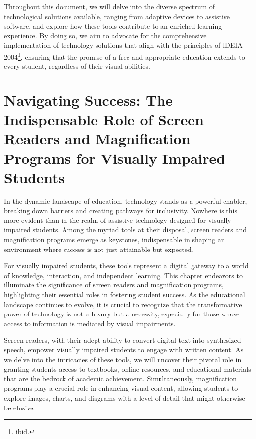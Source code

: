\documentclass[14pt,letterpaper,twoside]{extreport}
\begin{document}
 Throughout this document, we will delve into the diverse spectrum of technological solutions available, ranging from adaptive devices to assistive software, and explore how these tools contribute to an enriched learning experience. By doing so, we aim to advocate for the comprehensive implementation of technology solutions that align with the principles of IDEIA 2004\footnote{\href{https://sites.ed.gov/idea/statuteregulations/}{ibid.}}, ensuring that the promise of a free and appropriate education extends to every student, regardless of their visual abilities.

\pagebreak
\fancyhead[RO]{\lastxmark}
\fancyhead[LE]{\firstxmark}

\hypertarget{vision-assistive-technology-laptop-computer-requirements}{\chapter{Navigating Success: The Indispensable Role of Screen Readers and Magnification Programs for Visually Impaired Students}\label{vision-assistive-technology-laptop-computer-requirements} }
In the dynamic landscape of education, technology stands as a powerful enabler, breaking down barriers and creating pathways for inclusivity. Nowhere is this more evident than in the realm of assistive technology designed for visually impaired students. Among the myriad tools at their disposal, screen readers and magnification programs emerge as keystones, indispensable in shaping an environment where success is not just attainable but expected.

For visually impaired students, these tools represent a digital gateway to a world of knowledge, interaction, and independent learning. This chapter endeavors to illuminate the significance of screen readers and magnification programs, highlighting their essential roles in fostering student success. As the educational landscape continues to evolve, it is crucial to recognize that the transformative power of technology is not a luxury but a necessity, especially for those whose access to information is mediated by visual impairments.

Screen readers, with their adept ability to convert digital text into synthesized speech, empower visually impaired students to engage with written content. As we delve into the intricacies of these tools, we will uncover their pivotal role in granting students access to textbooks, online resources, and educational materials that are the bedrock of academic achievement. Simultaneously, magnification programs play a crucial role in enhancing visual content, allowing students to explore images, charts, and diagrams with a level of detail that might otherwise be elusive.
\end{document}
